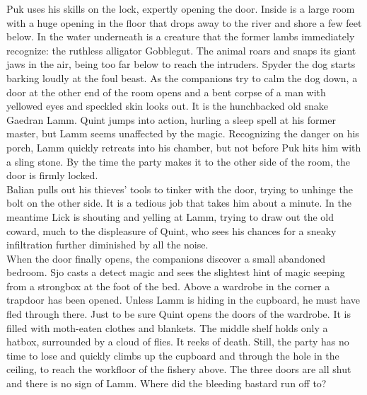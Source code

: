 Puk uses his skills on the lock, expertly opening the door. Inside is a large room with a huge opening in the floor that drops away to the river and shore a few feet below. In the water underneath is a creature that the former lambs immediately recognize: the ruthless alligator Gobblegut. The animal roars and snaps its giant jaws in the air, being too far below to reach the intruders. Spyder the dog starts barking loudly at the foul beast. As the companions try to calm the dog down, a door at the other end of the room opens and a bent corpse of a man with yellowed eyes and speckled skin looks out. It is the hunchbacked old snake Gaedran Lamm. Quint jumps into action, hurling a sleep spell at his former master, but Lamm seems unaffected by the magic. Recognizing the danger on his porch, Lamm quickly retreats into his chamber, but not before Puk hits him with a sling stone. By the time the party makes it to the other side of the room, the door is firmly locked.\\

Balian pulls out his thieves' tools to tinker with the door, trying to unhinge the bolt on the other side. It is a tedious job that takes him about a minute. In the meantime Lick is shouting and yelling at Lamm, trying to draw out the old coward, much to the displeasure of Quint, who sees his chances for a sneaky infiltration further diminished by all the noise.\\

When the door finally opens, the companions discover a small abandoned bedroom. Sjo casts a detect magic and sees the slightest hint of magic seeping from a strongbox at the foot of the bed. Above a wardrobe in the corner a trapdoor has been opened. Unless Lamm is hiding in the cupboard, he must have fled through there. Just to be sure Quint opens the doors of the wardrobe. It is filled with moth-eaten clothes and blankets. The middle shelf holds only a hatbox, surrounded by a cloud of flies. It reeks of death. Still, the party has no time to lose and quickly climbs up the cupboard and through the hole in the ceiling, to reach the workfloor of the fishery above. The three doors are all shut and there is no sign of Lamm. Where did the bleeding bastard run off to?\\

